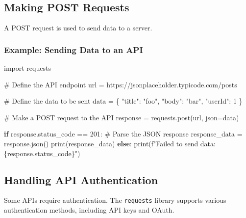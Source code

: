 \documentclass[
  letterpaper,
  DIV=11,
  numbers=noendperiod]{scrreprt}
\newenvironment{Shaded}{\begin{snugshade}}{\end{snugshade}}
\newcommand{\BuiltInTok}[1]{\textcolor[rgb]{0.00,0.23,0.31}{#1}}
\newcommand{\CommentTok}[1]{\textcolor[rgb]{0.37,0.37,0.37}{#1}}
\newcommand{\ControlFlowTok}[1]{\textcolor[rgb]{0.00,0.23,0.31}{\textbf{#1}}}
\newcommand{\DecValTok}[1]{\textcolor[rgb]{0.68,0.00,0.00}{#1}}
\newcommand{\ImportTok}[1]{\textcolor[rgb]{0.00,0.46,0.62}{#1}}
\newcommand{\NormalTok}[1]{\textcolor[rgb]{0.00,0.23,0.31}{#1}}
\newcommand{\OperatorTok}[1]{\textcolor[rgb]{0.37,0.37,0.37}{#1}}
\newcommand{\SpecialCharTok}[1]{\textcolor[rgb]{0.37,0.37,0.37}{#1}}
\newcommand{\SpecialStringTok}[1]{\textcolor[rgb]{0.13,0.47,0.30}{#1}}
\newcommand{\StringTok}[1]{\textcolor[rgb]{0.13,0.47,0.30}{#1}}
\begin{document}
\subsection{Making POST Requests}\label{making-post-requests}

A POST request is used to send data to a server.

\subsubsection{Example: Sending Data to an
API}\label{example-sending-data-to-an-api}

\begin{Shaded}
\begin{Highlighting}[]
\ImportTok{import}\NormalTok{ requests}

\CommentTok{\# Define the API endpoint}
\NormalTok{url }\OperatorTok{=} \StringTok{\textquotesingle{}https://jsonplaceholder.typicode.com/posts\textquotesingle{}}

\CommentTok{\# Define the data to be sent}
\NormalTok{data }\OperatorTok{=}\NormalTok{ \{}
    \StringTok{"title"}\NormalTok{: }\StringTok{"foo"}\NormalTok{,}
    \StringTok{"body"}\NormalTok{: }\StringTok{"bar"}\NormalTok{,}
    \StringTok{"userId"}\NormalTok{: }\DecValTok{1}
\NormalTok{\}}

\CommentTok{\# Make a POST request to the API}
\NormalTok{response }\OperatorTok{=}\NormalTok{ requests.post(url, json}\OperatorTok{=}\NormalTok{data)}

\ControlFlowTok{if}\NormalTok{ response.status\_code }\OperatorTok{==} \DecValTok{201}\NormalTok{:}
    \CommentTok{\# Parse the JSON response}
\NormalTok{    response\_data }\OperatorTok{=}\NormalTok{ response.json()}
    \BuiltInTok{print}\NormalTok{(response\_data)}
\ControlFlowTok{else}\NormalTok{:}
    \BuiltInTok{print}\NormalTok{(}\SpecialStringTok{f"Failed to send data: }\SpecialCharTok{\{}\NormalTok{response}\SpecialCharTok{.}\NormalTok{status\_code}\SpecialCharTok{\}}\SpecialStringTok{"}\NormalTok{)}
\end{Highlighting}
\end{Shaded}

\subsection{Handling API
Authentication}\label{handling-api-authentication}

Some APIs require authentication. The \texttt{requests} library supports
various authentication methods, including API keys and OAuth.
\end{document}
